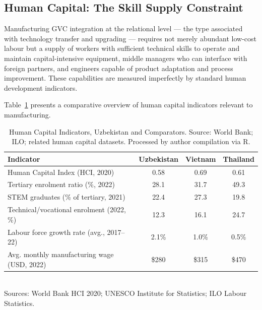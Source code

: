 \subsection{Human Capital: The Skill Supply Constraint}

Manufacturing GVC integration at the relational level --- the type associated with technology transfer and upgrading --- requires not merely abundant low-cost labour but a supply of workers with sufficient technical skills to operate and maintain capital-intensive equipment, middle managers who can interface with foreign partners, and engineers capable of product adaptation and process improvement. These capabilities are measured imperfectly by standard human development indicators.

Table~\ref{tab:human_capital} presents a comparative overview of human capital indicators relevant to manufacturing.

\begin{table}[H]
 \centering
 \caption{Human Capital Indicators, Uzbekistan and Comparators. Source: World Bank; ILO; related human capital datasets. Processed by author compilation via R.}
 \label{tab:human_capital}
 \small
 \begin{tabular}{@{}lccc@{}}
 \toprule
 Indicator & Uzbekistan & Vietnam & Thailand \\
 \midrule
 Human Capital Index (HCI, 2020) & 0.58 & 0.69 & 0.61 \\
 Tertiary enrolment ratio (\%, 2022) & 28.1 & 31.7 & 49.3 \\
 STEM graduates (\% of tertiary, 2021) & 22.4 & 27.3 & 19.8 \\
 Technical/vocational enrolment (2022, \%) & 12.3 & 16.1 & 24.7 \\
 Labour force growth rate (avg., 2017--22) & 2.1\% & 1.0\% & 0.5\% \\
 Avg. monthly manufacturing wage (USD, 2022) & \$280 & \$315 & \$470 \\
 \bottomrule
 \end{tabular}
 \\\smallskip
 \small Sources: World Bank HCI 2020; UNESCO Institute for Statistics; ILO Labour Statistics.
\end{table}

